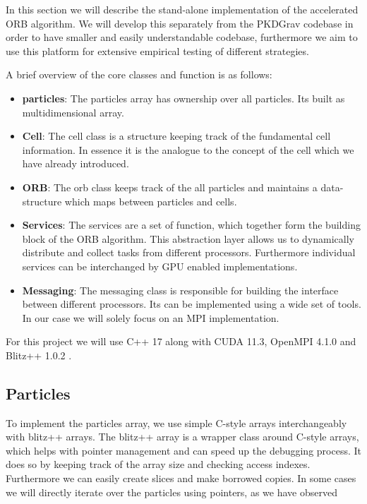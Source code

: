 \documentclass[]{article}
\begin{document}
In this section we will describe the stand-alone implementation of the accelerated ORB algorithm. We will develop this separately from the PKDGrav codebase in order to have smaller and easily understandable codebase, furthermore we aim to use this platform for extensive empirical testing of different strategies.

A brief overview of the core classes and function is as follows:

\begin{itemize}
	\item \textbf{particles}: The particles array has ownership over all particles. Its built as multidimensional array.
	\item \textbf{Cell}: The cell class is a structure keeping track of the fundamental cell information. In essence it is the analogue to the concept of the cell which we have already introduced. 
	\item \textbf{ORB}: The orb class keeps track of the all particles and maintains a data-structure which maps between particles and cells. 
	\item \textbf{Services}: The services are a set of function, which together form the building block of the ORB algorithm. This abstraction layer allows us to dynamically distribute and collect tasks from different processors. Furthermore individual services can be interchanged by GPU enabled implementations.
	\item \textbf{Messaging}: The messaging class is responsible for building the interface between different processors. Its can be implemented using a wide set of tools. In our case we will solely focus on an MPI implementation.
	
\end{itemize}

For this project we will use C++ 17 along with CUDA 11.3, OpenMPI 4.1.0 and Blitz++ 1.0.2 \cite{blitzcpp}. 

\subsection{Particles}

To implement the particles array, we use simple C-style arrays interchangeably with blitz++ arrays. The blitz++ array is a wrapper class around C-style arrays, which helps with pointer management and can speed up the debugging process. It does so by keeping track of the array size and checking access indexes. Furthermore we can easily create slices and make borrowed copies. 
In some cases we will directly iterate over the particles using pointers, as we have observed 
\end{document}
